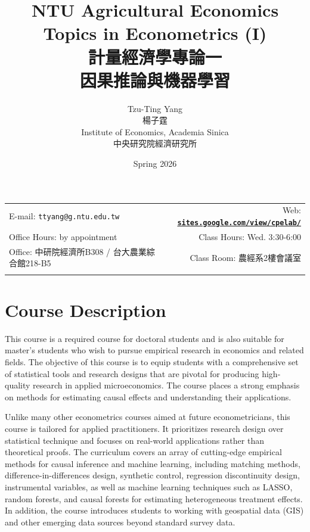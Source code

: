 \documentclass[11pt]{article}
\title{NTU Agricultural Economics \\  Topics in Econometrics (I) \\ 	計量經濟學專論一 \\ 因果推論與機器學習}
\author{Tzu-Ting Yang \\ 楊子霆 \\ Institute of Economics, Academia Sinica  \\ 中央研究院經濟研究所}
\date{Spring 2026}
\begin{document}
\maketitle

\medskip

\begin{tabular*}{1.03\textwidth}{@{\extracolsep{\fill}}lr}


  E-mail: \texttt{ttyang@g.ntu.edu.tw} & Web: \href{https://sites.google.com/view/cpelab/}{\tt\bf sites.google.com/view/cpelab/}  \\

 Office Hours: by appointment   &  Class Hours: Wed. 3:30-6:00 \\


 Office: 中研院經濟所B308 / 台大農業綜合館218-B5  & Class Room: 農經系2樓會議室 \\
&  \\
\hline
\end{tabular*}

\vspace{10 mm}

\section*{Course Description}

This course is a required course for doctoral students and is also suitable for master's students who wish to pursue empirical research in economics and related fields. The objective of this course is to equip students with a comprehensive set of statistical tools and research designs that are pivotal for producing high-quality research in applied microeconomics. The course places a strong emphasis on methods for estimating causal effects and understanding their applications.

Unlike many other econometrics courses aimed at future econometricians, this course is tailored for applied practitioners. It prioritizes research design over statistical technique and focuses on real-world applications rather than theoretical proofs. The curriculum covers an array of cutting-edge empirical methods for causal inference and machine learning, including matching methods, difference-in-differences design, synthetic control, regression discontinuity design, instrumental variables, as well as machine learning techniques such as LASSO, random forests, and causal forests for estimating heterogeneous treatment effects. In addition, the course introduces students to working with geospatial data (GIS) and other emerging data sources beyond standard survey data.
\end{document}
